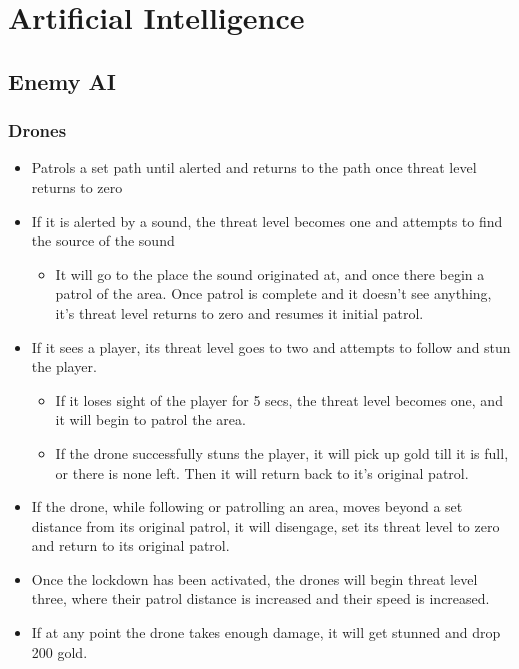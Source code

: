\documentclass[10pt]{report}
\begin{document}
\chapter{Artificial Intelligence}

\section{Enemy AI}

\subsection{Drones}

\begin{itemize}
    \item Patrols a set path until alerted and returns to the path once threat level returns to zero
    \item If it is alerted by a sound, the threat level becomes one and attempts to find the source of the sound
    \begin{itemize}
        \item It will go to the place the sound originated at, and once there begin a patrol of the area. Once patrol is complete and it doesn’t see anything, it’s threat level returns to zero and resumes it initial patrol.
    \end{itemize}
    \item If it sees a player, its threat level goes to two and attempts to follow and stun the player.
    \begin{itemize}
        \item If it loses sight of the player for 5 secs, the threat level becomes one, and it will begin to patrol the area.
        \item If the drone successfully stuns the player, it will pick up gold till it is full, or there is none left. Then it will return back to it's original patrol.
    \end{itemize}
    \item If the drone, while following or patrolling an area, moves beyond a set distance from its original patrol, it will disengage, set its threat level to zero and return to its original patrol.
    \item Once the lockdown has been activated, the drones will begin threat level three, where their patrol distance is increased and their speed is increased.
    \item If at any point the drone takes enough damage, it will get stunned and drop 200 gold.    
\end{itemize}
\end{document}
